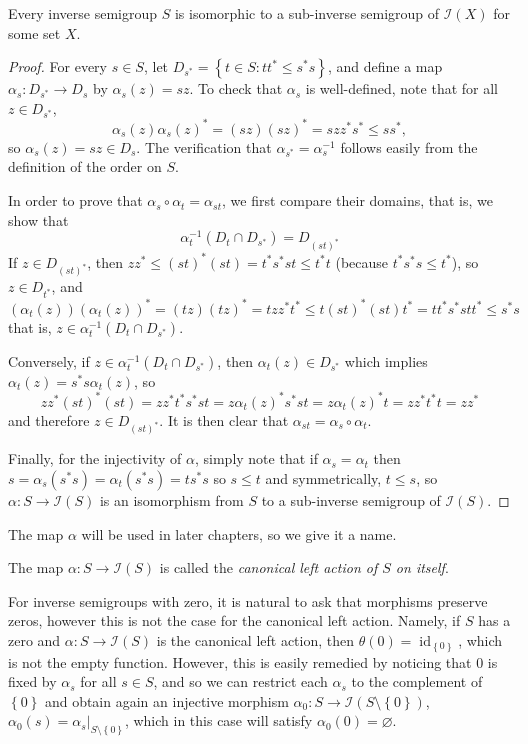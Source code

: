 \begin{theorem}\label{theoremwagnerpreston}
Every inverse semigroup $S$ is isomorphic to a sub-inverse semigroup of $\mathcal{I}(X)$ for some set $X$.
\end{theorem}
\begin{proof}
For every $s\in S$, let $D_{s^*}=\left\{t\in S:tt^*\leq s^*s\right\}$, and define a map $\alpha_s:D_{s^*}\to D_s$ by $\alpha_s(z)=sz$. To check that $\alpha_s$ is well-defined, note that for all $z\in D_{s^*}$,
\[\alpha_s(z)\alpha_s(z)^*=(sz)(sz)^*=szz^*s^*\leq ss^*,\]
so $\alpha_s(z)=sz\in D_s$. The verification that $\alpha_{s^*}=\alpha_s^{-1}$ follows easily from the definition of the order on $S$.

In order to prove that $\alpha_s\circ\alpha_t=\alpha_{st}$, we first compare their domains, that is, we show that
\[\alpha_t^{-1}(D_t\cap D_{s^*})=D_{(st)^*}\]
If $z\in D_{(st)^*}$, then $zz^*\leq (st)^*(st)=t^*s^*st\leq t^*t$ (because $t^*s^*s\leq t^*$), so $z\in D_{t^*}$, and
\[(\alpha_t(z))(\alpha_t(z))^*=(tz)(tz)^*=tzz^*t^*\leq t(st)^*(st)t^*=tt^*s^*stt^*\leq s^*s\]
that is, $z\in\alpha_t^{-1}(D_t\cap D_{s^*})$.

Conversely, if $z\in \alpha_t^{-1}(D_t\cap D_{s^*})$, then $\alpha_t(z)\in D_{s^*}$ which implies $\alpha_t(z)=s^*s\alpha_t(z)$, so
\[zz^*(st)^*(st)=zz^*t^*s^*st=z\alpha_t(z)^*s^*st=z\alpha_t(z)^*t=zz^*t^*t=zz^*\]
and therefore $z\in D_{(st)^*}$. It is then clear that $\alpha_{st}=\alpha_s\circ\alpha_t$.

Finally, for the injectivity of $\alpha$, simply note that if $\alpha_s=\alpha_t$ then $s=\alpha_s(s^*s)=\alpha_t(s^*s)=ts^*s$ so $s\leq t$ and symmetrically, $t\leq s$, so $\alpha:S\to\mathcal{I}(S)$ is an isomorphism from $S$ to a sub-inverse semigroup of $\mathcal{I}(S)$.\qedhere
\end{proof}

The map $\alpha$ will be used in later chapters, so we give it a name.

\begin{definition}\label{definitioncanonicalleftaction}
The map $\alpha:S\to\mathcal{I}(S)$ is called the \emph{canonical left action of $S$ on itself}.
\end{definition}

\begin{remark}
For inverse semigroups with zero, it is natural to ask that morphisms preserve zeros, however this is not the case for the canonical left action. Namely, if $S$ has a zero and $\alpha:S\to\mathcal{I}(S)$ is the canonical left action, then $\theta(0)=\operatorname{id}_{\left\{0\right\}}$, which is not the empty function. However, this is easily remedied by noticing that $0$ is fixed by $\alpha_s$ for all $s\in S$, and so we can restrict each $\alpha_s$ to the complement of $\left\{0\right\}$ and obtain again an injective morphism $\alpha_0:S\to\mathcal{I}(S\setminus\left\{0\right\})$, $\alpha_0(s)=\alpha_s|_{S\setminus\left\{0\right\}}$, which in this case will satisfy $\alpha_0(0)=\varnothing$.
\end{remark}

